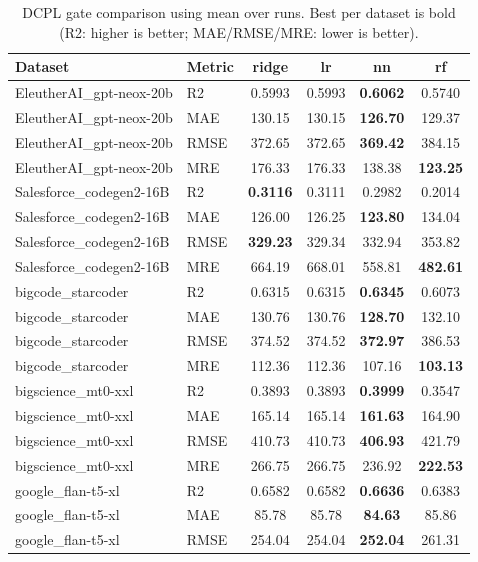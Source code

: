 \begin{table}[t]
\centering
\small
\caption{DCPL gate comparison using mean over runs. Best per dataset is bold (R2: higher is better; MAE/RMSE/MRE: lower is better).}
\label{tab:dcpl-gate-compare-boldbest}
\begin{tabular}{llcccc}
\toprule
Dataset & Metric & ridge & lr & nn & rf \\
\midrule
EleutherAI\_gpt-neox-20b & R2 & 0.5993 & 0.5993 & \textbf{0.6062} & 0.5740 \\
EleutherAI\_gpt-neox-20b & MAE & 130.15 & 130.15 & \textbf{126.70} & 129.37 \\
EleutherAI\_gpt-neox-20b & RMSE & 372.65 & 372.65 & \textbf{369.42} & 384.15 \\
EleutherAI\_gpt-neox-20b & MRE & 176.33 & 176.33 & 138.38 & \textbf{123.25} \\
\addlinespace
Salesforce\_codegen2-16B & R2 & \textbf{0.3116} & 0.3111 & 0.2982 & 0.2014 \\
Salesforce\_codegen2-16B & MAE & 126.00 & 126.25 & \textbf{123.80} & 134.04 \\
Salesforce\_codegen2-16B & RMSE & \textbf{329.23} & 329.34 & 332.94 & 353.82 \\
Salesforce\_codegen2-16B & MRE & 664.19 & 668.01 & 558.81 & \textbf{482.61} \\
\addlinespace
bigcode\_starcoder & R2 & 0.6315 & 0.6315 & \textbf{0.6345} & 0.6073 \\
bigcode\_starcoder & MAE & 130.76 & 130.76 & \textbf{128.70} & 132.10 \\
bigcode\_starcoder & RMSE & 374.52 & 374.52 & \textbf{372.97} & 386.53 \\
bigcode\_starcoder & MRE & 112.36 & 112.36 & 107.16 & \textbf{103.13} \\
\addlinespace
bigscience\_mt0-xxl & R2 & 0.3893 & 0.3893 & \textbf{0.3999} & 0.3547 \\
bigscience\_mt0-xxl & MAE & 165.14 & 165.14 & \textbf{161.63} & 164.90 \\
bigscience\_mt0-xxl & RMSE & 410.73 & 410.73 & \textbf{406.93} & 421.79 \\
bigscience\_mt0-xxl & MRE & 266.75 & 266.75 & 236.92 & \textbf{222.53} \\
\addlinespace
google\_flan-t5-xl & R2 & 0.6582 & 0.6582 & \textbf{0.6636} & 0.6383 \\
google\_flan-t5-xl & MAE & 85.78 & 85.78 & \textbf{84.63} & 85.86 \\
google\_flan-t5-xl & RMSE & 254.04 & 254.04 & \textbf{252.04} & 261.31 \\

\end{tabular}
\end{table}
